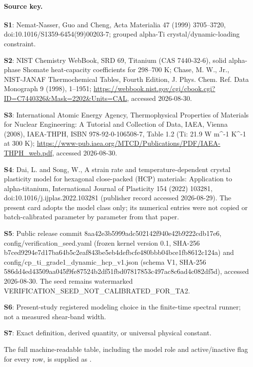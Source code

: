\paragraph{Source key.}
\textbf{S1}: Nemat-Nasser, Guo and Cheng, Acta Materialia 47 (1999) 3705--3720, doi:10.1016/S1359-6454(99)00203-7; grouped alpha-Ti crystal/dynamic-loading constraint.\par
\textbf{S2}: NIST Chemistry WebBook, SRD 69, Titanium (CAS 7440-32-6), solid alpha-phase Shomate heat-capacity coefficients for 298--700 K; Chase, M. W., Jr., NIST-JANAF Thermochemical Tables, Fourth Edition, J. Phys. Chem. Ref. Data Monograph 9 (1998), 1--1951; \url{https://webbook.nist.gov/cgi/cbook.cgi?ID=C7440326&Mask=2202&Units=CAL}, accessed 2026-08-30.\par
\textbf{S3}: International Atomic Energy Agency, Thermophysical Properties of Materials for Nuclear Engineering: A Tutorial and Collection of Data, IAEA, Vienna (2008), IAEA-THPH, ISBN 978-92-0-106508-7, Table 1.2 (Ti: 21.9 W m\textasciicircum{}-1 K\textasciicircum{}-1 at 300 K); \url{https://www-pub.iaea.org/MTCD/Publications/PDF/IAEA-THPH_web.pdf}, accessed 2026-08-30.\par
\textbf{S4}: Dai, L. and Song, W., A strain rate and temperature-dependent crystal plasticity model for hexagonal close-packed (HCP) materials: Application to alpha-titanium, International Journal of Plasticity 154 (2022) 103281, doi:10.1016/j.ijplas.2022.103281 (publisher record accessed 2026-08-29). The present card adopts the model class only; its numerical entries were not copied or batch-calibrated parameter by parameter from that paper.\par
\textbf{S5}: Public release commit 8aa42e3b5999adc502142f940e42b9222cdb17e6, config/verification\_seed.yaml (frozen kernel version 0.1, SHA-256 b7ced9294e7d17ba64b5c2eaf843be5eb4defbcfe480bbb04bce1fb8612c124a) and config/cp\_ti\_grade1\_dynamic\_hcp\_v1.json (schema V1, SHA-256 586dd4ed43509aa045f9fe87524b2df51fbd07817853c497ac8c6ad4c082df5d), accessed 2026-08-30. The seed remains watermarked VERIFICATION\_SEED\_NOT\_CALIBRATED\_FOR\_TA2.\par
\textbf{S6}: Present-study registered modeling choice in the finite-time spectral runner; not a measured shear-band width.\par
\textbf{S7}: Exact definition, derived quantity, or universal physical constant.\par

The full machine-readable table, including the model role and active/inactive flag for every row, is supplied as .
